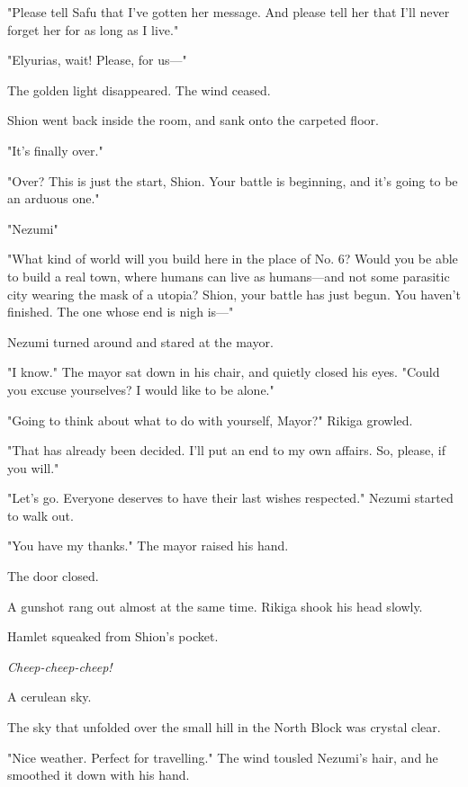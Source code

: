 "Please tell Safu that I've gotten her message. And please tell her that
I'll never forget her for as long as I live."


"Elyurias, wait! Please, for us---"


The golden light disappeared. The wind ceased.

\mybreak

Shion went back inside the room, and sank onto the carpeted floor.

"It's finally over."

"Over? This is just the start, Shion. Your battle is beginning, and it's
going to be an arduous one."

"Nezumi\el "

"What kind of world will you build here in the place of No. 6? Would you
be able to build a real town, where humans can live as humans---and not
some parasitic city wearing the mask of a utopia? Shion, your battle has
just begun. You haven't finished. The one whose end is nigh is---"

Nezumi turned around and stared at the mayor.

"I know." The mayor sat down in his chair, and quietly closed his eyes.
"Could you excuse yourselves? I would like to be alone."

"Going to think about what to do with yourself, Mayor?" Rikiga growled.

"That has already been decided. I'll put an end to my own affairs. So,
please, if you will."

"Let's go. Everyone deserves to have their last wishes respected."
Nezumi started to walk out.

"You have my thanks." The mayor raised his hand.

The door closed.

A gunshot rang out almost at the same time. Rikiga shook his head
slowly.

Hamlet squeaked from Shion's pocket.

\emph{Cheep-cheep-cheep!}

\mybreak

A cerulean sky.

The sky that unfolded over the small hill in the North Block was crystal
clear.

"Nice weather. Perfect for travelling." The wind tousled Nezumi's hair,
and he smoothed it down with his hand.

